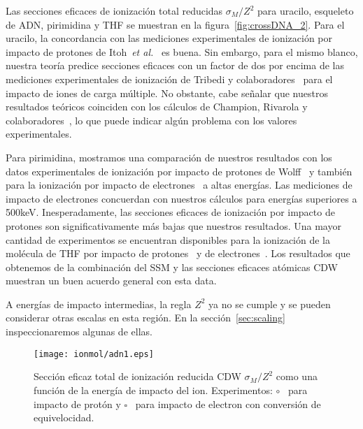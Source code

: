 Las secciones eficaces de ionización total reducidas $\sigma_M/Z^2$ 
para uracilo, esqueleto de ADN, pirimidina y THF se muestran en la 
figura~\ref{fig:crossDNA_2}. Para el uracilo, la concordancia con las 
mediciones experimentales de ionización por impacto de protones de 
Itoh~\textit{et al.}~\cite{itoh2013} es buena. Sin embargo, para el 
mismo blanco, nuestra teoría predice secciones eficaces con un factor 
de dos por encima de las mediciones experimentales de ionización de 
Tribedi y colaboradores~\cite{agnihotri2012,agnihotri2013} para el 
impacto de iones de carga múltiple. No obstante, cabe señalar que 
nuestros resultados teóricos coinciden con los cálculos de Champion, 
Rivarola y colaboradores~\cite{agnihotri2012,champion2012}, lo que 
puede indicar algún problema con los valores experimentales.


Para pirimidina, mostramos una comparación de nuestros resultados con 
los datos experimentales de ionización por impacto de protones de 
Wolff~\cite{wolff2014} y también para la ionización por impacto de 
electrones~\cite{bug2017} a altas energías. Las mediciones de impacto 
de electrones concuerdan con nuestros cálculos para energías superiores 
a 500keV. Inesperadamente, las secciones eficaces de ionización por 
impacto de protones son significativamente más bajas que nuestros 
resultados. Una mayor cantidad de experimentos se encuentran disponibles 
para la ionización de la molécula de THF por impacto de 
protones~\cite{wang2016} y de electrones~\cite{bug2017,wolf2019,fuss2009}. 
Los resultados que obtenemos de la combinación del SSM y las secciones
eficaces atómicas CDW muestran un buen acuerdo general con esta data.

A energías de impacto intermedias, la regla $Z^2$ ya no se cumple y se 
pueden considerar otras escalas en esta región. En la 
sección~\ref{sec:scaling} inspeccionaremos algunas de ellas.



\begin{figure*}[t!]
\centering
\texttt{[image: ionmol/adn1.eps]}
\caption[Sección eficaz total de ionización reducida de moléculas (parte 1).]
{Sección eficaz total de ionización reducida CDW $\sigma_{M}/Z^2$ como una 
función de la energía de impacto del ion. Experimentos: 
\mbox{\Large$\circ$}~\cite{iriki2011} para impacto de protón y
$\square$~\cite{rahman2016} para impacto de electron con conversión de
equivelocidad.}
\label{fig:crossDNA_1}
\end{figure*} 

